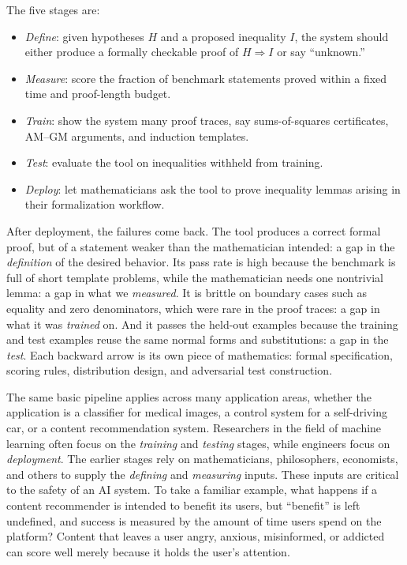 The five stages are:

\begin{itemize} 
  \item \emph{Define}: given hypotheses $H$ and a proposed inequality $I$, the system should either produce a formally checkable proof of $H\Rightarrow I$ or say ``unknown.'' 
  \item \emph{Measure}: score the fraction of benchmark statements proved within a fixed time and proof-length budget. 
  \item \emph{Train}: show the system many proof traces, say sums-of-squares certificates, AM--GM arguments, and induction templates. 
  \item \emph{Test}: evaluate the tool on inequalities withheld from training. 
  \item \emph{Deploy}: let mathematicians ask the tool to prove inequality lemmas arising in their formalization workflow. 
\end{itemize}

After deployment, the failures come back. The tool produces a correct formal proof, but of a statement weaker than the mathematician intended: a gap in the \emph{definition} of the desired behavior. Its pass rate is high because the benchmark is full of short template problems, while the mathematician needs one nontrivial lemma: a gap in what we \emph{measured}. It is brittle on boundary cases such as equality and zero denominators, which were rare in the proof traces: a gap in what it was \emph{trained} on. And it passes the held-out examples because the training and test examples reuse the same normal forms and substitutions: a gap in the \emph{test}. Each backward arrow is its own piece of mathematics: formal specification, scoring rules, distribution design, and adversarial test construction.

The same basic pipeline applies across many application areas, whether the application is a classifier for medical images, a control system for a self-driving car, or a content recommendation system. Researchers in the field of machine learning often focus on the \emph{training} and \emph{testing} stages, while engineers focus on \emph{deployment}. The earlier stages rely on mathematicians, philosophers, economists, and others to supply the \emph{defining} and \emph{measuring} inputs. These inputs are critical to the safety of an AI system. To take a familiar example, what happens if a content recommender is intended to benefit its users, but ``benefit'' is left undefined, and success is measured by the amount of time users spend on the platform? Content that leaves a user angry, anxious, misinformed, or addicted can score well merely because it holds the user's attention.

